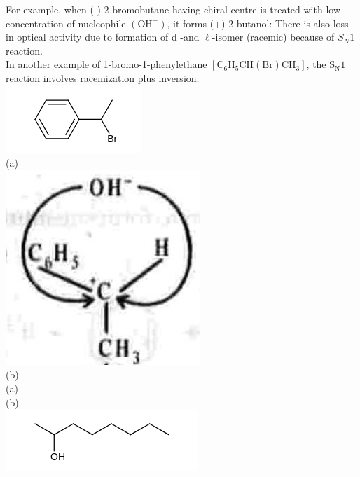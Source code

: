 \documentclass[10pt]{article}
\begin{document}
For example, when (-) 2-bromobutane having chiral centre is treated with low concentration of nucleophile $\left(\mathrm{OH}^{-}\right)$, it forms (+)-2-butanol: There is also loss in optical activity due to formation of d -and $\ell$-isomer (racemic) because of $S_{N} 1$ reaction.\\
In another example of 1-bromo-1-phenylethane $\left[\mathrm{C}_{6} \mathrm{H}_{5} \mathrm{CH}(\mathrm{Br}) \mathrm{CH}_{3}\right]$, the $\mathrm{S}_{\mathrm{N}} 1$ reaction involves racemization plus inversion.\\
\includegraphics{smile-26236ca5bf9bec75c9ac71fab126dcb39e06291e}\\
(a)\\
\includegraphics[max width=\textwidth, center]{2025_01_28_8470952b98110cec3aabg-093(1)}\\
(b)\\
(a)\\
(b)\\
\includegraphics{smile-465a50be2a81a1605454b30f66a2fb10176f0ba2}\\
\end{document}

